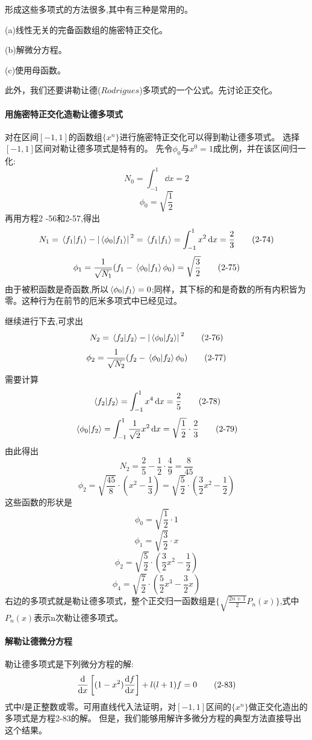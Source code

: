 形成这些多项式的方法很多,其中有三种是常用的。

(a)线性无关的完备函数组的施密特正交化。

(b)解微分方程。

(c)使用母函数。

此外，我们还要讲勒让德($Rodrigues$)多项式的一个公式。先讨论正交化。

\paragraph*{用施密特正交化造勒让德多项式}对在区间$[-1,1]$的函数组$\{x^n\}$进行施密特正交化可以得到勒让德多项式。
选择$[-1,1]$区间对勒让德多项式是特有的。
先令$\phi_0$与$x^0=1$成比例，并在该区间归一化:
\[N_0=\int_{-1}^1\dd{x}=2 \tag{2-72}\]
\[\phi_0=\sqrt{\frac{1}{2}} \tag{2-73}\]
再用方程2 -56和2-57,得出
\[N_1=\bra*{f_1}\ket*{f_1}-\abs*{\bra*{\phi_0}\ket*{f_1}}^2=\bra*{f_1}\ket*{f_1}=\int_{-1}^1x^2\dd{x}=\frac{2}{3} \tag{2-74}\]
\[\phi_1=\frac{1}{\sqrt{N_1}}(f_1-\bra*{\phi_0}\ket*{f_1}\phi_0)=\sqrt{\frac{3}{2}} \tag{2-75}\]
由于被积函数是奇函数,所以$\bra*{\phi_0}\ket*{f_1}=0$;同样，其下标的和是奇数的所有内积皆为零。这种行为在前节的厄米多项式中已经见过。

继续进行下去,可求出
\[N_2=\bra*{f_2}\ket*{f_2}-\abs*{\bra*{\phi_0}\ket*{f_2}}^2 \tag{2-76}\]
\[\phi_2=\frac{1}{\sqrt{N_2}}(f_2-\bra*{\phi_0}\ket*{f_2}\phi_0) \tag{2-77}\]
需要计算
\[\bra*{f_2}\ket*{f_2}=\int_{-1}^1x^4\dd{x}=\frac{2}{5} \tag{2-78}\]
\[\bra*{\phi_0}\ket*{f_2}=\int_{-1}^1\frac{1}{\sqrt{2}}x^2\dd{x}=\sqrt{\frac{1}{2}} \cdot \frac{2}{3} \tag{2-79}\]
由此得出
\[N_2=\frac{2}{5}-\frac{1}{2} \cdot \frac{4}{9}=\frac{8}{45} \tag{2-80}\]
\[\phi_2=\sqrt{\frac{45}{8}} \cdot \left(x^2-\frac{1}{3}\right)=\sqrt{\frac{5}{2}} \cdot \left(\frac{3}{2}x^2-\frac{1}{2}\right) \tag{2-81}\]
这些函数的形状是
\[\phi_0=\sqrt{\frac{1}{2}} \cdot 1\]
\[\phi_1=\sqrt{\frac{3}{2}} \cdot x\]
\[\phi_2=\sqrt{\frac{5}{2}} \cdot \left(\frac{3}{2}x^2-\frac{1}{2}\right)\]
\[\phi_4=\sqrt{\frac{7}{2}} \cdot \left(\frac{5}{2}x^3-\frac{3}{2}x\right) \tag{2-82}\]
右边的多项式就是勒让德多项式，整个正交归一函数组是$\{\sqrt{\frac{2n+1}{2}}P_n(x)\}$,式中$P_n(x)$表示n次勒让德多项式。

\paragraph*{解勒让德微分方程}勒让德多项式是下列微分方程的解:
\[\dv{x} \left [(1-x^2) \dv{f}{x} \right ]+l(l+1)f=0 \tag{2-83}\]
式中$l$是正整数或零。可用直线代入法证明，对$[-1,1]$区间的$\{x^n\}$做正交化造出的多项式是方程2-83的解。
但是，我们能够用解许多微分方程的典型方法直接导出这个结果。

